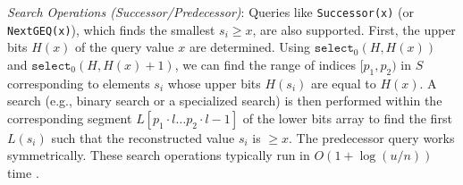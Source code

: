 \emph{Search Operations (Successor/Predecessor)}: Queries like \texttt{Successor(x)} (or \texttt{NextGEQ(x)}), which finds the smallest $s_i \ge x$, are also supported. First, the upper bits $H(x)$ of the query value $x$ are determined. Using $\texttt{select}_0(H, H(x))$ and $\texttt{select}_0(H, H(x)+1)$, we can find the range of indices $[p_1, p_2)$ in $S$ corresponding to elements $s_i$ whose upper bits $H(s_i)$ are equal to $H(x)$. A search (e.g., binary search or a specialized search) is then performed within the corresponding segment $L[p_1 \cdot l \dots p_2 \cdot l - 1]$ of the lower bits array to find the first $L(s_i)$ such that the reconstructed value $s_i$ is $\ge x$. The predecessor query works symmetrically. These search operations typically run in $O(1 + \log(u/n))$ time \cite{pibiri_et_al, ferragina2023pearls}.

